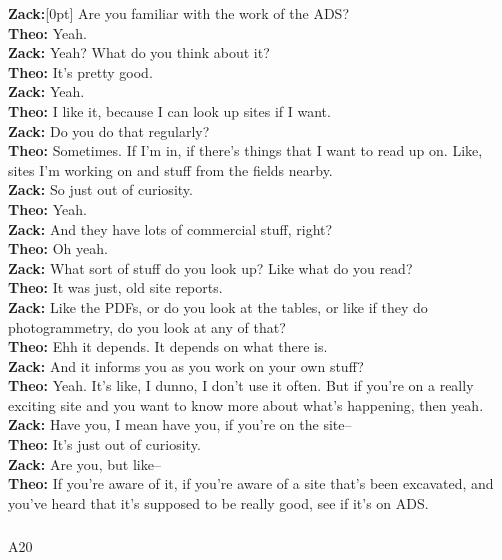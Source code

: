 \documentclass[
]{article}
\makeatletter
\let\oldsubparagraph\subparagraph
\renewcommand{\subparagraph}{
    \@ifstar
      \xxxSubParagraphStar
      \xxxSubParagraphNoStar
  }
\newcommand{\xxxSubParagraphStar}[1]{\oldsubparagraph*{#1}\mbox{}}
\newcommand{\xxxSubParagraphNoStar}[1]{\oldsubparagraph{#1}\mbox{}}
\newcommand{\paragraphnumber}[1]{\marginnote{\color{lightgray}\tiny{#1}}[0pt]}
\makeatother
\begin{document}
\textbf{Zack:}\paragraphnumber{[70]} Are you familiar with the work of
the ADS?\\
\textbf{Theo:} Yeah.\\
\textbf{Zack:} Yeah? What do you think about it?\\
\textbf{Theo:} It's pretty good.\\
\textbf{Zack:} Yeah.\\
\textbf{Theo:} I like it, because I can look up sites if I want.\\
\textbf{Zack:} Do you do that regularly?\\
\textbf{Theo:} Sometimes. If I'm in, if there's things that I want to
read up on. Like, sites I'm working on and stuff from the fields
nearby.\\
\textbf{Zack:} So just out of curiosity.\\
\textbf{Theo:} Yeah.\\
\textbf{Zack:} And they have lots of commercial stuff, right?\\
\textbf{Theo:} Oh yeah.\\
\textbf{Zack:} What sort of stuff do you look up? Like what do you
read?\\
\textbf{Theo:} It was just, old site reports.\\
\textbf{Zack:} Like the PDFs, or do you look at the tables, or like if
they do photogrammetry, do you look at any of that?\\
\textbf{Theo:} Ehh it depends. It depends on what there is.\\
\textbf{Zack:} And it informs you as you work on your own stuff?\\
\textbf{Theo:} Yeah. It's like, I dunno, I don't use it often. But if
you're on a really exciting site and you want to know more about what's
happening, then yeah.\\
\textbf{Zack:} Have you, I mean have you, if you're on the site--\\
\textbf{Theo:} It's just out of curiosity.\\
\textbf{Zack:} Are you, but like--\\
\textbf{Theo:} If you're aware of it, if you're aware of a site that's
been excavated, and you've heard that it's supposed to be really good,
see if it's on ADS.

\subparagraph{A20}\label{sec-A20}
\end{document}
